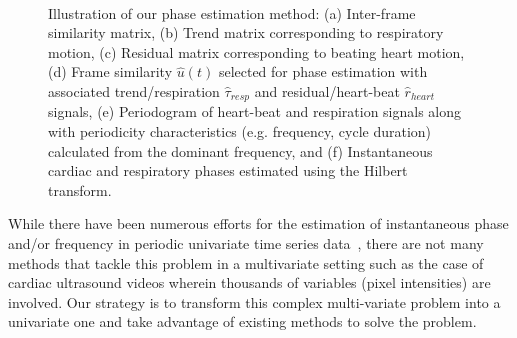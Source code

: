 \documentclass[journal]{IEEEtran}
\newcounter{lfigcounter}
\def\ionbox#1{\makebox[#1]{(\alph{lfigcounter})}\stepcounter{lfigcounter}}
\begin{document}
\begin{figure}[!t]
\ionbox{6.0in}\\
%
\caption{Illustration of our phase estimation method: (a) Inter-frame similarity matrix, (b) Trend matrix corresponding to respiratory motion, (c) Residual matrix corresponding to beating heart motion, (d) Frame similarity $\hat{u}(t)$ selected for phase estimation with associated trend/respiration $\hat{\tau}_{resp}$ and residual/heart-beat $\hat{r}_{heart}$ signals, (e) Periodogram of heart-beat and respiration signals along with periodicity characteristics (e.g. frequency, cycle duration) calculated from the dominant frequency, and (f) Instantaneous cardiac and respiratory phases estimated using the Hilbert transform.}
\label{fig:phase_estimation}
\end{figure}
%
While there have been numerous efforts for the estimation of instantaneous phase and/or frequency in periodic univariate time series data~\cite{Boashash1992,Rosenblum2001,Freund2003,Luo2003,Lu2013}, there are not many methods that tackle this problem in a multivariate setting such as the case of cardiac ultrasound videos wherein thousands of variables (pixel intensities) are involved. Our strategy is to transform this complex multi-variate problem into a univariate one and take advantage of existing methods to solve the problem. 
\end{document}
